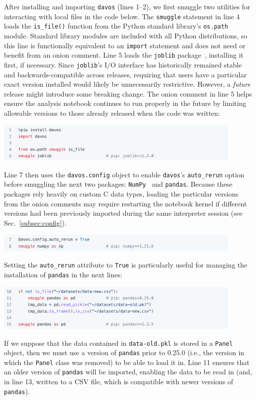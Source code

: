 \documentclass[preprint,12pt,a4paper]{elsarticle}
\begin{document}
After installing and importing \texttt{davos} (lines 1--2), we first smuggle two
utilities for interacting with local files in the code below. The
\texttt{smuggle} statement in line 4 loads the \texttt{is\_file()}
function from the Python standard library's \texttt{os.path}
module. Standard library modules are included with all Python
distributions, so this line is functionally equivalent to an
\texttt{import} statement and does not need or benefit from an onion
comment. Line 5 loads the \texttt{joblib} package~\cite{Varo10},
installing it first, if necessary. Since \texttt{joblib}'s I/O
interface has historically remained stable and backwards-compatible
across releases, requiring that users have a particular exact version
installed would likely be unnecessarily restrictive. However, a
\textit{future} release might introduce some breaking change.  The
onion comment in line 5 helps ensure the analysis notebook continues
to run properly in the future by limiting allowable versions to those
already released when the code was written:
\begin{center}
\includegraphics[width=0.9\textwidth]{figs/example1}
\end{center}
Line 7 then uses the \texttt{davos.config} object to enable
\texttt{davos}'s \texttt{auto\_rerun} option before smuggling the next
two packages: \texttt{NumPy}~\cite{HarrEtal20} and
\texttt{pandas}. Because these packages rely heavily on custom C data
types, loading the particular versions from the onion comments may
require restarting the notebook kernel if different versions had been previously
imported during the same interpreter session (see
Sec.~\ref{subsec:config}).
\begin{center}
\includegraphics[width=0.9\textwidth]{figs/example2}
\end{center}
Setting the \texttt{auto\_rerun} attribute to \texttt{True} is particularly useful
for managing the installation of \texttt{pandas} in the next
lines:
\begin{center}
\includegraphics[width=0.9\textwidth]{figs/example3}
\end{center}
If we suppose that the data contained in \texttt{data-old.pkl} is
stored in a \texttt{Panel} object, then we must use a version of 
\texttt{pandas} prior to 0.25.0 (i.e., the version in which the \texttt{Panel} 
class was removed) to be able to load it in. Line 11 ensures
that an older version of \texttt{pandas} will be imported, enabling
the data to be read in (and, in line 13, written to a CSV
file, which is compatible with newer versions of \texttt{pandas}).
\end{document}
